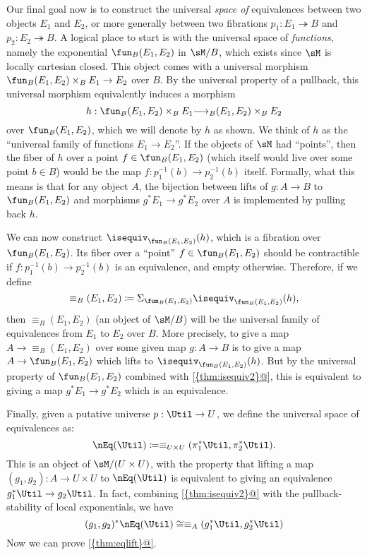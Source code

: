 \documentclass{amsart}
\let\fib\twoheadrightarrow
\theoremstyle{remark}
{\newtheorem{{rmk}}[thm]{{Remark}}}
\numberwithin{equation}{section}
\theoremstyle{plain}
\begin{document}
Our final goal now is to construct the universal \emph{space of} equivalences between two objects $E_1$ and $E_2$, or more generally between two fibrations $p_1 : E_1 \fib B$ and $p_2 : E_2\fib B$.
A logical place to start is with the universal space of \emph{functions}, namely the exponential $\fun_B(E_1,E_2)$ in $\sM/B$, which exists since $\sM$ is locally cartesian closed.
This object comes with a universal morphism $\fun_B(E_1,E_2) \times_B E_1 \to E_2$ over $B$.
By the universal property of a pullback, this universal morphism equivalently induces a morphism
\[ h:\fun_B(E_1,E_2) \times_B E_1 {\ensuremath{\overset{}{\longrightarrow}}}_B(E_1,E_2) \times_B E_2 \]
over $\fun_B(E_1,E_2)$, which we will denote by $h$ as shown.
We think of $h$ as the ``universal family of functions $E_1 \to E_2$''.
If the objects of $\sM$ had ``points'', then the fiber of $h$ over a point $f\in \fun_B(E_1,E_2)$ (which itself would live over some point $b\in B$) would be the map $f : p_1^{-1}(b) \to p_2^{-1}(b)$ itself.
Formally, what this means is that for any object $A$, the bijection between lifts of $g:A\to B$ to $\fun_B(E_1,E_2)$ and morphisms $g^*E_1 \to g^* E_2$ over $A$ is implemented by pulling back $h$.

We can now construct $\isequiv_{\fun_B(E_1,E_2)}(h)$, which is a fibration over $\fun_B(E_1,E_2)$.
Its fiber over a ``point'' $f\in \fun_B(E_1,E_2)$ should be contractible if $f : p_1^{-1}(b) \to p_2^{-1}(b)$ is an equivalence, and empty otherwise.
Therefore, if we define
\[ \equiv_B(E_1,E_2) \coloneqq \Sigma_{\fun_B(E_1,E_2)} \isequiv_{\fun_B(E_1,E_2)}(h), \]
then $\equiv_B(E_1,E_2)$ (an object of $\sM/B$) will be the universal family of equivalences from $E_1$ to $E_2$ over $B$.
More precisely, to give a map $A\to \equiv_B(E_1,E_2)$ over some given map $g:A\to B$ is to give a map $A\to \fun_B(E_1,E_2)$ which lifts to $\isequiv_{\fun_B(E_1,E_2)}(h)$.
But by the universal property of $\fun_B(E_1,E_2)$ combined with {\ref{{thm:isequiv2}@}}, this is equivalent to giving a map $g^*E_1 \to g^*E_2$ which is an equivalence.

Finally, given a putative universe $p:\Util\to U$, we define the universal space of equivalences as:
\[\nEq(\Util) \coloneqq \equiv_{U\times U}(\pi_1^*\Util,\pi_2^*\Util).\]
This is an object of $\sM/(U\times U)$, with the property that lifting a map $(g_1,g_2):A\to U\times U$ to $\nEq(\Util)$ is equivalent to giving an equivalence $g_1^* \Util \to g_2 \Util$.
In fact, combining {\ref{{thm:isequiv2}@}} with the pullback-stability of local exponentials, we have
\[(g_1,g_2)^* \nEq(\Util) \cong \equiv_A(g_1^*\Util, g_2^*\Util) \]
Now we can prove {\ref{{thm:eqlift}@}}.
\end{document}
